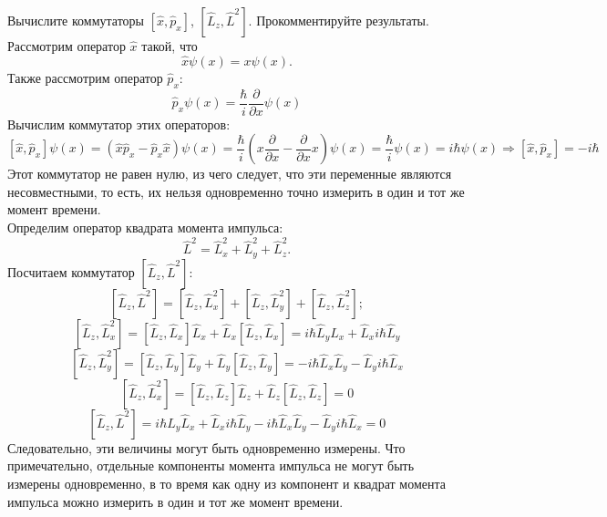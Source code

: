 \documentclass[__main__.tex]{subfiles}
\begin{document}
Вычислите коммутаторы $\left[\hat{x}, \hat{p}_x\right]$, $\left[\hat{L}_z,\hat{L}^2\right]$. Прокомментируйте результаты.\\ 

Рассмотрим оператор $\hat{x}$ такой, что 
$$
\hat{x}\psi(x)=x\psi(x).
$$
Также рассмотрим оператор $\hat{p}_x$:
$$
\hat{p}_x\psi(x)=\frac{\hbar}{i}\dfrac{\partial}{\partial x}\psi (x)
$$
Вычислим коммутатор этих операторов:
$$
[\hat{x}, \hat{p}_x]\psi(x)=(\hat{x}\hat{p}_x-\hat{p}_x\hat{x})\psi(x)=\frac{\hbar}{i}(x\frac{\partial}{\partial x}-\frac{\partial}{\partial x}x)\psi(x)=\frac{\hbar}{i}\psi(x)=i\hbar\psi(x) \Longrightarrow [\hat{x}, \hat{p}_x]=-i\hbar
$$
Этот коммутатор не равен нулю, из чего следует, что эти переменные являются несовместными, то есть, их нельзя одновременно точно измерить в один и тот же момент времени.\\

Определим оператор квадрата момента импульса:
$$
\hat{L}^2=\hat{L}_x^2+\hat{L}_y^2+\hat{L}_z^2.
$$
Посчитаем коммутатор $\left[\hat{L}_z,\hat{L}^2\right]$:
$$
\left[\hat{L}_z,\hat{L}^2\right] = \left[\hat{L}_z,\hat{L}^2_x\right] + \left[\hat{L}_z,\hat{L}^2_y\right]+\left[\hat{L}_z,\hat{L}^2_z\right];
$$
$$
\left[\hat{L}_z,\hat{L}^2_x\right]= \left[\hat{L}_z,\hat{L}_x\right]\hat{L}_x+\hat{L}_x\left[\hat{L}_z,\hat{L}_x\right]=i\hbar\hat{L}_y\hat{L}_x+\hat{L}_xi\hbar\hat{L}_y
$$
$$
\left[\hat{L}_z,\hat{L}^2_y\right]= \left[\hat{L}_z,\hat{L}_y\right]\hat{L}_y+\hat{L}_y\left[\hat{L}_z,\hat{L}_y\right]=-i\hbar\hat{L}_x\hat{L}_y-\hat{L}_yi\hbar\hat{L}_x
$$
$$
\left[\hat{L}_z,\hat{L}^2_x\right]= \left[\hat{L}_z,\hat{L}_z\right]\hat{L}_z+\hat{L}_z\left[\hat{L}_z,\hat{L}_z\right]=0
$$
$$
\left[\hat{L}_z,\hat{L}^2\right] = i\hbar\hat{L}_y\hat{L}_x+\hat{L}_xi\hbar\hat{L}_y-i\hbar\hat{L}_x\hat{L}_y-\hat{L}_yi\hbar\hat{L}_x = 0
$$
Следовательно, эти величины могут быть одновременно измерены. Что примечательно, отдельные компоненты момента импульса не могут быть измерены одновременно, в то время как одну из компонент и квадрат момента импульса можно измерить в один и тот же момент времени.
\end{document}
